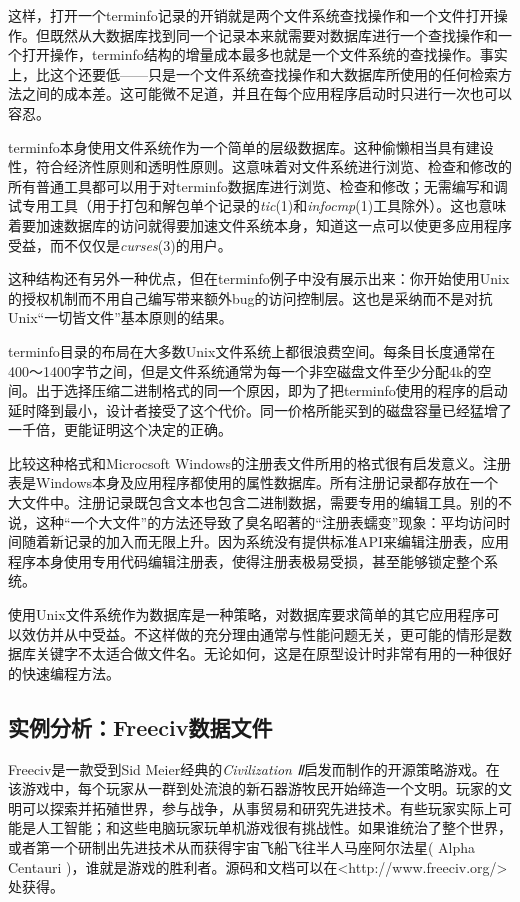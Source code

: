 \documentclass[12pt,oneside]{book}
\begin{document}
\begin{common-format}
这样，打开一个terminfo记录的开销就是两个文件系统查找操作和一个文件打开操作。但既然从大数据库找到同一个记录本来就需要对数据库进行一个查找操作和一个打开操作，terminfo结构的增量成本最多也就是一个文件系统的查找操作。事实上，比这个还要低——只是一个文件系统查找操作和大数据库所使用的任何检索方法之间的成本差。这可能微不足道，并且在每个应用程序启动时只进行一次也可以容忍。

terminfo本身使用文件系统作为一个简单的层级数据库。这种偷懒相当具有建设性，符合经济性原则和透明性原则。这意味着对文件系统进行浏览、检查和修改的所有普通工具都可以用于对terminfo数据库进行浏览、检查和修改；无需编写和调试专用工具（用于打包和解包单个记录的\textit{tic}(1)和\textit{infocmp}(1)工具除外）。这也意味着要加速数据库的访问就得要加速文件系统本身，知道这一点可以使更多应用程序受益，而不仅仅是\textit{curses}(3)的用户。

这种结构还有另外一种优点，但在terminfo例子中没有展示出来：你开始使用Unix的授权机制而不用自己编写带来额外bug的访问控制层。这也是采纳而不是对抗Unix“一切皆文件”基本原则的结果。

terminfo目录的布局在大多数Unix文件系统上都很浪费空间。每条目长度通常在400～1400字节之间，但是文件系统通常为每一个非空磁盘文件至少分配4k的空间。出于选择压缩二进制格式的同一个原因，即为了把terminfo使用的程序的启动延时降到最小，设计者接受了这个代价。同一价格所能买到的磁盘容量已经猛增了一千倍，更能证明这个决定的正确。

比较这种格式和Microcsoft Windows的注册表文件所用的格式很有启发意义。注册表是Windows本身及应用程序都使用的属性数据库。所有注册记录都存放在一个大文件中。注册记录既包含文本也包含二进制数据，需要专用的编辑工具。别的不说，这种“一个大文件”的方法还导致了臭名昭著的“注册表蠕变”现象：平均访问时间随着新记录的加入而无限上升。因为系统没有提供标准API来编辑注册表，应用程序本身使用专用代码编辑注册表，使得注册表极易受损，甚至能够锁定整个系统。

使用Unix文件系统作为数据库是一种策略，对数据库要求简单的其它应用程序可以效仿并从中受益。不这样做的充分理由通常与性能问题无关，更可能的情形是数据库关键字不太适合做文件名。无论如何，这是在原型设计时非常有用的一种很好的快速编程方法。


\subsection{实例分析：Freeciv数据文件}
Freeciv是一款受到Sid Meier经典的\textit{Civilization Ⅱ}启发而制作的开源策略游戏。在该游戏中，每个玩家从一群到处流浪的新石器游牧民开始缔造一个文明。玩家的文明可以探索并拓殖世界，参与战争，从事贸易和研究先进技术。有些玩家实际上可能是人工智能；和这些电脑玩家玩单机游戏很有挑战性。如果谁统治了整个世界，或者第一个研制出先进技术从而获得宇宙飞船飞往半人马座阿尔法星( Alpha Centauri )，谁就是游戏的胜利者。源码和文档可以在<http://www.freeciv.org/>处获得。


\end{common-format}
\end{document}
